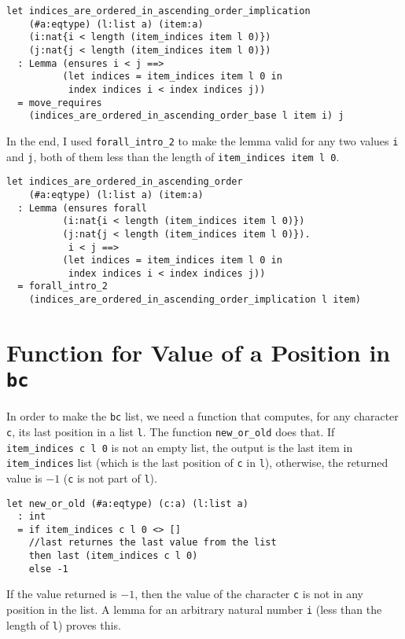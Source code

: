 \begin{verbatim}
let indices_are_ordered_in_ascending_order_implication
    (#a:eqtype) (l:list a) (item:a) 
    (i:nat{i < length (item_indices item l 0)}) 
    (j:nat{j < length (item_indices item l 0)})
  : Lemma (ensures i < j ==>
          (let indices = item_indices item l 0 in 
           index indices i < index indices j))
  = move_requires 
    (indices_are_ordered_in_ascending_order_base l item i) j
\end{verbatim}

In the end, I used \texttt{forall\_intro\_2} to make the lemma valid for any two values \texttt{i} and \texttt{j}, both of them less than the length of \texttt{item\_indices item l 0}.

\begin{verbatim}
let indices_are_ordered_in_ascending_order
    (#a:eqtype) (l:list a) (item:a) 
  : Lemma (ensures forall 
          (i:nat{i < length (item_indices item l 0)}) 
          (j:nat{j < length (item_indices item l 0)}).
           i < j ==>
          (let indices = item_indices item l 0 in 
           index indices i < index indices j))
  = forall_intro_2
    (indices_are_ordered_in_ascending_order_implication l item) 
\end{verbatim}

\section{Function for Value of a Position in \texttt{bc}}

In order to make the \texttt{bc} list, we need a function that computes, for any character \texttt{c}, its last position in a list \texttt{l}. The function \texttt{new\_or\_old} does that. If \texttt{item\_indices c l 0} is not an empty list, the output is the last item in \texttt{item\_indices} list (which is the last position of \texttt{c} in \texttt{l}), otherwise, the returned value is \(-1\) (\texttt{c} is not part of \texttt{l}).

\begin{verbatim}
let new_or_old (#a:eqtype) (c:a) (l:list a) 
  : int
  = if item_indices c l 0 <> []
    //last returnes the last value from the list
    then last (item_indices c l 0)
    else -1
\end{verbatim}

If the value returned is \(-1\), then the value of the character \texttt{c} is not in any position in the list. A lemma for an arbitrary natural number \texttt{i} (less than the length of \texttt{l}) proves this. 

